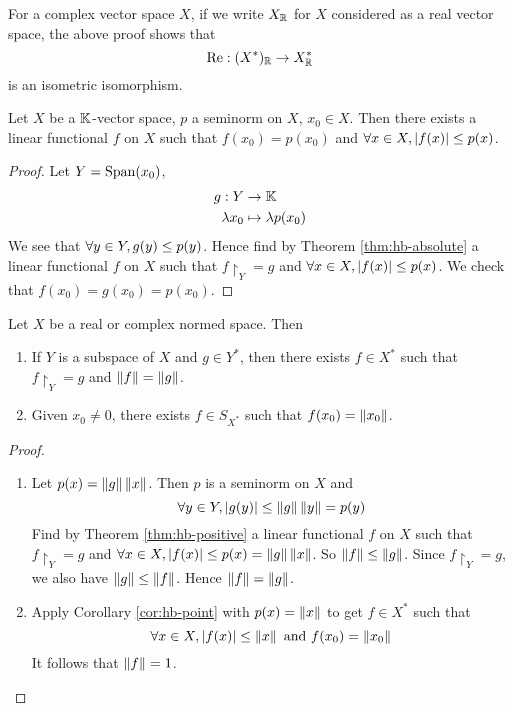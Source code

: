 \documentclass{article}
\begin{document}
\begin{rmk}
  For a complex vector space $X$, if we write $X_\mathbb R$ for $X$ considered as a real vector space, the above proof shows that
  $$\operatorname{Re} : (X^*)_\mathbb R \rightarrow X_\mathbb R^*$$
  is an isometric isomorphism.
\end{rmk}

\begin{ncor}\label{cor:hb-point}
  Let $X$ be a $\mathbb K$-vector space, $p$ a seminorm on $X$, $x_0 \in X$. Then there exists a linear functional $f$ on $X$ such that $f(x_0) = p(x_0)$ and $\forall x \in X, |f(x)| \le p(x)$.
\end{ncor}
\begin{proof}
  Let $Y = \operatorname{Span}(x_0)$,
  \begin{align*}
    g : Y & \rightarrow \mathbb K \\
    \lambda x_0 & \mapsto \lambda p(x_0)
  \end{align*}
  We see that $\forall y \in Y, g(y) \le p(y)$. Hence find by Theorem \ref{thm:hb-absolute} a linear functional $f$ on $X$ such that $f\restriction_Y = g$ and $\forall x \in X, |f(x)| \le p(x)$. We check that $f(x_0) = g(x_0) = p(x_0)$.
\end{proof}

\begin{nthm}\label{thm:hb-support}
  Let $X$ be a real or complex normed space. Then
  \begin{enumerate}
    \item If $Y$ is a subspace of $X$ and $g \in Y^*$, then there exists $f \in X^*$ such that $f\restriction_Y = g$ and $\left\lVert f\right\rVert = \left\lVert g\right\rVert$.
    \item Given $x_0 \ne 0$, there exists $f \in S_{X^*}$ such that $f(x_0) = \left\lVert x_0\right\rVert$.
  \end{enumerate}
\end{nthm}
\begin{proof}~
  \begin{enumerate}
    \item Let $p(x) = \left\lVert g\right\rVert \left\lVert x\right\rVert$. Then $p$ is a seminorm on $X$ and
      $$\forall y \in Y, |g(y)| \le \left\lVert g\right\rVert \left\lVert y\right\rVert = p(y)$$
      Find by Theorem \ref{thm:hb-positive} a linear functional $f$ on $X$ such that $f\restriction_Y = g$ and $\forall x \in X, |f(x)| \le p(x) = \left\lVert g\right\rVert \left\lVert x\right\rVert$. So $\left\lVert f\right\rVert \le \left\lVert g\right\rVert$. Since $f\restriction_Y = g$, we also have $\left\lVert g\right\rVert \le \left\lVert f\right\rVert$. Hence $\left\lVert f\right\rVert = \left\lVert g\right\rVert$.
    \item Apply Corollary \ref{cor:hb-point} with $p(x) = \left\lVert x\right\rVert$ to get $f \in X^*$ such that
      $$\forall x \in X, |f(x)| \le \left\lVert x\right\rVert \text{ and } f(x_0) = \left\lVert x_0\right\rVert$$
      It follows that $\left\lVert f\right\rVert = 1$.
  \end{enumerate}
\end{proof}
\end{document}
